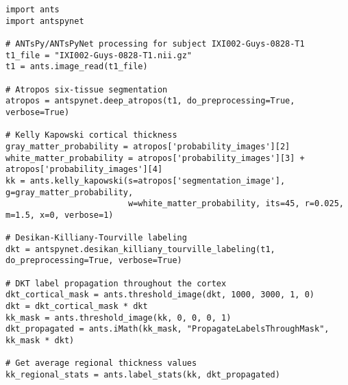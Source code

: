 


\begin{lstlisting}
import ants
import antspynet

# ANTsPy/ANTsPyNet processing for subject IXI002-Guys-0828-T1
t1_file = "IXI002-Guys-0828-T1.nii.gz"
t1 = ants.image_read(t1_file)

# Atropos six-tissue segmentation
atropos = antspynet.deep_atropos(t1, do_preprocessing=True, verbose=True)

# Kelly Kapowski cortical thickness
gray_matter_probability = atropos['probability_images'][2]
white_matter_probability = atropos['probability_images'][3] + atropos['probability_images'][4]
kk = ants.kelly_kapowski(s=atropos['segmentation_image'], g=gray_matter_probability,
                         w=white_matter_probability, its=45, r=0.025, m=1.5, x=0, verbose=1)

# Desikan-Killiany-Tourville labeling
dkt = antspynet.desikan_killiany_tourville_labeling(t1, do_preprocessing=True, verbose=True)

# DKT label propagation throughout the cortex
dkt_cortical_mask = ants.threshold_image(dkt, 1000, 3000, 1, 0)
dkt = dkt_cortical_mask * dkt
kk_mask = ants.threshold_image(kk, 0, 0, 0, 1)
dkt_propagated = ants.iMath(kk_mask, "PropagateLabelsThroughMask", kk_mask * dkt)

# Get average regional thickness values
kk_regional_stats = ants.label_stats(kk, dkt_propagated)
\end{lstlisting}


